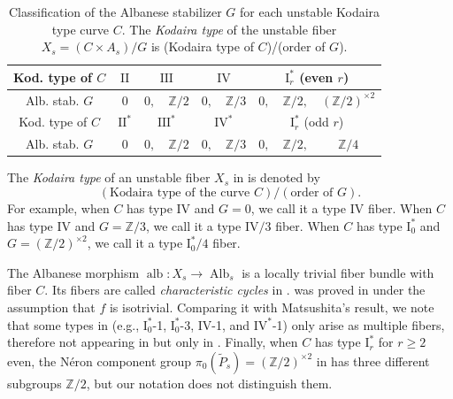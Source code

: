 \documentclass[reqno, letterpaper]{amsart}
\numberwithin{equation}{subsection}
\let\to\longrightarrow
\newcommand{\ZZ}{\mathbb{Z}}
\DeclareMathOperator{\Alb}{Alb}
\DeclareMathOperator{\alb}{alb}
\begin{document}
		\begin{table}[t]
			\begin{tabular}{|c||c|cc|cc|ccc|} \hline
				Kod. type of $C$ & $\mathrm {II}$ &  \multicolumn{2}{|c|}{$\mathrm {III}$} & \multicolumn{2}{|c|}{$\mathrm {IV}$} & \multicolumn{3}{|c|}{$\mathrm I_r^*$ (even $r$)} \\ \hline
				Alb. stab. $G$ & $0$ & $0,$ & $\ZZ/2$ & $0,$ & $\ZZ/3$ & $0,$ & $\ZZ/2,$ & $(\ZZ/2)^{\times 2}$ \\ \hline\hline
				Kod. type of $C$ & $\mathrm {II}^*$ & \multicolumn{2}{|c|}{$\mathrm {III}^*$} & \multicolumn{2}{|c|}{$\mathrm {IV}^*$} & \multicolumn{3}{|c|}{$\mathrm I_r^*$ (odd $r$)} \\ \hline
				Alb. stab. $G$ & $0$ & $0,$ & $\ZZ/2$ & $0,$ & $\ZZ/3$ & $0,$ & $\ZZ/2,$ & $\ZZ/4$ \\ \hline
			\end{tabular}
			
			\medskip
			
			\caption{Classification of the Albanese stabilizer $G$ for each unstable Kodaira type curve $C$. The \emph{Kodaira type} of the unstable fiber $X_s = (C \times A_s)/G$ is (Kodaira type of $C$)/(order of $G$).}
			\label{table:classification of G}
		\end{table}
		
		\begin{definition} \label{def:Kodaira type unstable}
			The \emph{Kodaira type} of an unstable fiber $X_s$ in  is denoted by
			\[ (\mbox{Kodaira type of the curve } C) / (\mbox{order of } G) .\]
			For example, when $C$ has type $\mathrm{IV}$ and $G = 0$, we call it a type $\mathrm {IV}$ fiber. When $C$ has type $\mathrm{IV}$ and $G = \ZZ/3$, we call it a type $\mathrm{IV}/3$ fiber. When $C$ has type $\mathrm I_0^*$ and $G = (\ZZ/2)^{\times 2}$, we call it a type $\mathrm I_0^*/4$ fiber.
		\end{definition}
		
		\begin{remark}
			The Albanese morphism $\alb : X_s \to \Alb_s$ is a locally trivial fiber bundle with fiber $C$. Its fibers are called \emph{characteristic cycles} in \cite{hwang-ogu09}.  was proved in \cite[Corollary~4.18--19]{kim-laza-mar26} under the assumption that $f$ is isotrivial. Comparing it with Matsushita's result, we note that some types in \cite[Table~4--5]{mat01} (e.g., $\mathrm I_0^*$-1, $\mathrm I_0^*$-3, $\mathrm {IV}$-1, and $\mathrm{IV}^*$-1) only arise as multiple fibers, therefore not appearing in  but only in . Finally, when $C$ has type $\mathrm I_r^*$ for $r \ge 2$ even, the N\'eron component group $\pi_0 (\tilde P_s) = (\ZZ/2)^{\times 2}$ in  has three different subgroups $\ZZ/2$, but our notation does not distinguish them.
		\end{remark}
		
\end{document}
